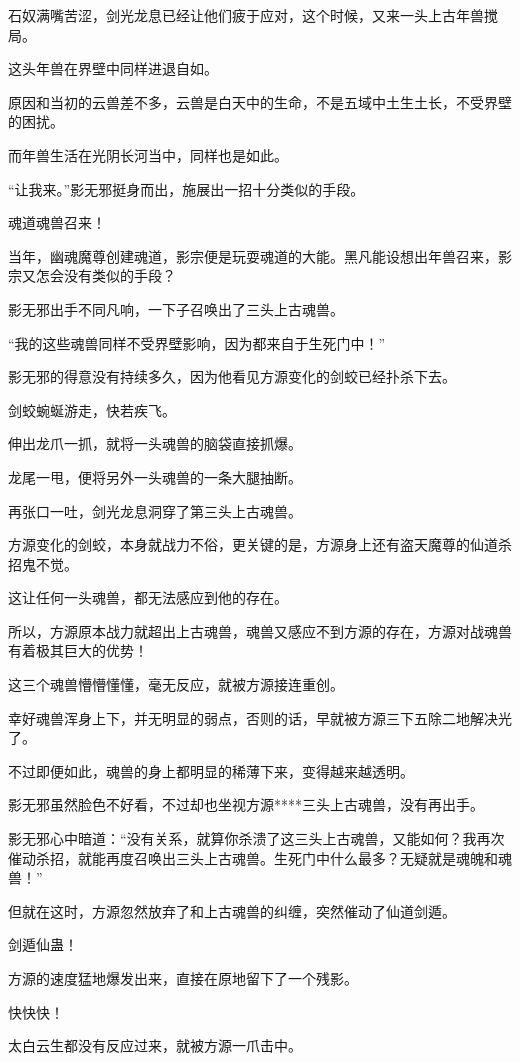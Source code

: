 \begin{this_body}
石奴满嘴苦涩，剑光龙息已经让他们疲于应对，这个时候，又来一头上古年兽搅局。

这头年兽在界壁中同样进退自如。

原因和当初的云兽差不多，云兽是白天中的生命，不是五域中土生土长，不受界壁的困扰。

而年兽生活在光阴长河当中，同样也是如此。

“让我来。”影无邪挺身而出，施展出一招十分类似的手段。

魂道魂兽召来！

当年，幽魂魔尊创建魂道，影宗便是玩耍魂道的大能。黑凡能设想出年兽召来，影宗又怎会没有类似的手段？

影无邪出手不同凡响，一下子召唤出了三头上古魂兽。

“我的这些魂兽同样不受界壁影响，因为都来自于生死门中！”

影无邪的得意没有持续多久，因为他看见方源变化的剑蛟已经扑杀下去。

剑蛟蜿蜒游走，快若疾飞。

伸出龙爪一抓，就将一头魂兽的脑袋直接抓爆。

龙尾一甩，便将另外一头魂兽的一条大腿抽断。

再张口一吐，剑光龙息洞穿了第三头上古魂兽。

方源变化的剑蛟，本身就战力不俗，更关键的是，方源身上还有盗天魔尊的仙道杀招鬼不觉。

这让任何一头魂兽，都无法感应到他的存在。

所以，方源原本战力就超出上古魂兽，魂兽又感应不到方源的存在，方源对战魂兽有着极其巨大的优势！

这三个魂兽懵懵懂懂，毫无反应，就被方源接连重创。

幸好魂兽浑身上下，并无明显的弱点，否则的话，早就被方源三下五除二地解决光了。

不过即便如此，魂兽的身上都明显的稀薄下来，变得越来越透明。

影无邪虽然脸色不好看，不过却也坐视方源****三头上古魂兽，没有再出手。

影无邪心中暗道：“没有关系，就算你杀溃了这三头上古魂兽，又能如何？我再次催动杀招，就能再度召唤出三头上古魂兽。生死门中什么最多？无疑就是魂魄和魂兽！”

但就在这时，方源忽然放弃了和上古魂兽的纠缠，突然催动了仙道剑遁。

剑遁仙蛊！

方源的速度猛地爆发出来，直接在原地留下了一个残影。

快快快！

太白云生都没有反应过来，就被方源一爪击中。


\end{this_body}
